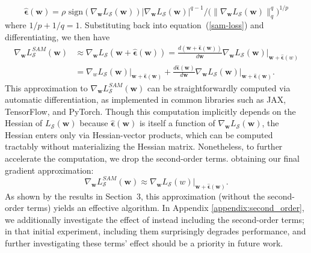 \documentclass{article} %
\begin{document}
\begin{equation}
\label{eq:dual-solution}
    \hat{\boldsymbol{\epsilon}}(\boldsymbol{w}) = \rho \mbox{ sign}\left(\nabla_{\boldsymbol{w}} L_\mathcal{S}(\boldsymbol{w})\right)\left|\nabla_{\boldsymbol{w}} L_\mathcal{S}(\boldsymbol{w})\right|^{q-1} / \bigg(\|\nabla_{\boldsymbol{w}} L_\mathcal{S}(\boldsymbol{w})\|_q^q\bigg)^{1/p}
\end{equation}
where $1/p + 1/q = 1$.  Substituting back into equation~(\ref{sam-loss}) and differentiating, we then have
\begin{equation*}
\begin{split}
\nabla_{\boldsymbol{w}} L^{SAM}_\mathcal{S}(\boldsymbol{w}) & \approx \nabla_{\boldsymbol{w}} L_\mathcal{S}(\boldsymbol{w} + \hat{\boldsymbol{\epsilon}}(\boldsymbol{w}))
= \frac{d (\boldsymbol{w} + {\hat{\boldsymbol{\epsilon}}(\boldsymbol{w})})}{d\boldsymbol{w}}\nabla_{\boldsymbol{w}}  L_\mathcal{S}(\boldsymbol{w})|_{\boldsymbol{w}+\hat{\boldsymbol{\epsilon}}(w)} \\
& =  {\nabla_w  L_\mathcal{S}(\boldsymbol{w})|_{\boldsymbol{w}+\hat{\boldsymbol{\epsilon}}(\boldsymbol{w})}} + {\frac{d \hat{\boldsymbol{\epsilon}}(\boldsymbol{w})}{d \boldsymbol{w}}\nabla_{\boldsymbol{w}}  L_\mathcal{S}(\boldsymbol{w})|_{\boldsymbol{w}+\hat{\boldsymbol{\epsilon}}(\boldsymbol{w})}}.
\end{split}
\end{equation*}
This approximation to $\nabla_{\boldsymbol{w}} L^{SAM}_\mathcal{S}(\boldsymbol{w})$ can be straightforwardly computed via automatic differentiation, as implemented in common libraries such as JAX, TensorFlow, and PyTorch.  Though this computation implicitly depends on the Hessian of $L_\mathcal{S}(\boldsymbol{w})$ because $\hat{\boldsymbol{\epsilon}}(\boldsymbol{w})$ is itself a function of $\nabla_{\boldsymbol{w}}  L_\mathcal{S}(\boldsymbol{w})$, the Hessian enters only via Hessian-vector products, which can be computed tractably without materializing the Hessian matrix.  Nonetheless, to further accelerate the computation, we drop the second-order terms.
obtaining our final gradient approximation:
\begin{equation}
\label{eq:sam-gradient}
\nabla_{\boldsymbol{w}} L^{SAM}_\mathcal{S}(\boldsymbol{w}) \approx {\nabla_{\boldsymbol{w}} L_\mathcal{S}(w)|_{\boldsymbol{w}+\hat{\boldsymbol{\epsilon}}(\boldsymbol{w})}}.
\end{equation}
As shown by the results in Section~3, this approximation (without the second-order terms) yields an effective algorithm.  In Appendix \ref{appendix:second_order}, we additionally investigate the effect of instead including the second-order terms; in that initial experiment, including them surprisingly degrades performance, and further investigating these terms' effect should be a priority in future work.
\end{document}
